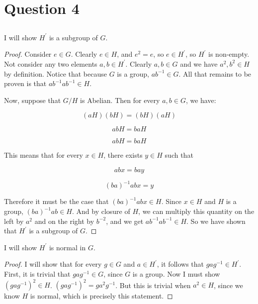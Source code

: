 \documentclass[a4paper,12pt]{article}
\numberwithin{equation}{section}
\begin{document}
\section{Question 4}

\subsection{}

I will show $H^{\prime}$ is a subgroup of $G$.

\begin{proof}
Consider $e \in G$. Clearly $e \in H$, and $e^2 = e$, so $e \in H^{\prime}$, so $H^{\prime}$ is non-empty. Not consider any two elements $a, b \in H^{\prime}$. Clearly $a, b \in G$ and we have $a^2, b^2 \in H$ by definition. Notice that because $G$ is a group, $ab^{-1} \in G$. All that remains to be proven is that $ab^{-1}ab^{-1} \in H$. 

Now, suppose that $G / H$ is Abelian. Then for every $a, b \in G$, we have:

\begin{equation}
(aH)(bH) = (bH)(aH)
\end{equation}

\begin{equation}
abH = baH
\end{equation}

\begin{equation}
abH = baH
\end{equation}

This means that for every $x \in H$, there exists $y \in H$ such that

\begin{equation}
abx = bay
\end{equation}

\begin{equation}
(ba)^{-1}abx = y
\end{equation}

Therefore it must be the case that $(ba)^{-1}abx \in H$. Since $x \in H$ and $H$ is a group, $(ba)^{-1}ab \in H$. And by closure of $H$, we can multiply this quantity on the left by $a^2$ and on the right by $b^{-2}$, and we get $ab^{-1}ab^{-1} \in H$. So we have shown that $H^{\prime}$ is a subgroup of $G$.

\end{proof}

I will show $H^{\prime}$ is normal in $G$.
\begin{proof}
I will show that for every $g \in G$ and $a \in H^{\prime}$, it follows that $gag^{-1} \in H^{\prime}$. First, it is trivial that $gag^{-1} \in G$, since $G$ is a group. Now I must show $(gag^{-1})^2 \in H$. $(gag^{-1})^2 = ga^2g^{-1}$. But this is trivial when $a^2 \in H$, since we know $H$ is normal, which is precisely this statement.
\end{proof}
\end{document}
